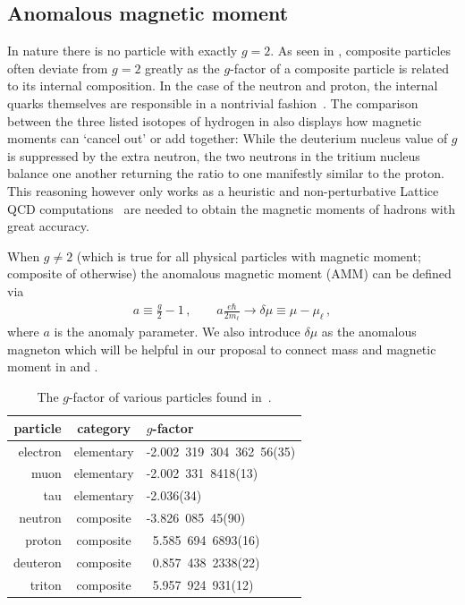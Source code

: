 \subsection{Anomalous magnetic moment}
In nature there is no particle with exactly $g\!=\!2$. As seen in , composite particles often deviate from $g\!=\!2$ greatly as the $g$-factor of a composite particle is related to its internal composition. In the case of the neutron and proton, the internal quarks themselves are responsible in a nontrivial fashion~\citep{Chang:2015qxa}. The comparison between the three listed isotopes of hydrogen in  also displays how magnetic moments can `cancel out' or add together: While the deuterium nucleus value of $g$ is suppressed by the extra neutron, the two neutrons in the tritium nucleus balance one another returning the ratio to one manifestly similar to the proton. This reasoning however only works as a heuristic and non-perturbative Lattice QCD computations~\citep{Detmold:2019ghl} are needed to obtain the magnetic moments of hadrons with great accuracy.

When $g\neq2$ (which is true for all physical particles with magnetic moment; composite of otherwise) the anomalous magnetic moment (AMM) can be defined via 
\begin{gather}
    \label{amm:1}
    a\equiv\frac{g}{2}-1\,,\qquad
    a\frac{e\hbar}{2m_{\ell}}\rightarrow\delta\mu\equiv\mu-\mu_{\ell}\,,
\end{gather}
where $a$ is the anomaly parameter. We also introduce $\delta\mu$ as the anomalous magneton which will be helpful in our proposal to connect mass and magnetic moment in  and .

\begin{table}
	\centering
\begin{tabular}{r|c|l}
    particle & category & $g$-factor\\
    \hline
	electron & elementary & -2.002\ 319\ 304\ 362\ 56(35)\\
	muon & elementary & -2.002\ 331\ 8418(13)\\
	tau & elementary & -2.036(34)\\
	neutron & composite & -3.826\ 085\ 45(90)\\
	proton & composite & \ 5.585\ 694\ 6893(16)\\
	deuteron & composite & \ 0.857\ 438\ 2338(22)\\
	triton & composite & \ 5.957\ 924\ 931(12)\\
\end{tabular}
	\caption{The $g$-factor of various particles found in~\cite{Tiesinga:2021myr,ParticleDataGroup:2022pth}.}
	\label{tab:gfactor}
\end{table}

